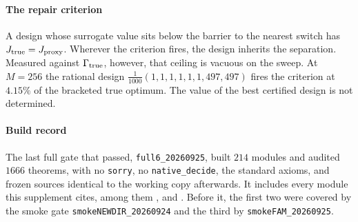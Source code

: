 \paragraph{The repair criterion} A design whose surrogate value sits below the barrier to the
nearest switch has $J_{\rm true}=J_{\rm proxy}$. Wherever the criterion fires, the design
inherits the separation. Measured against $\Gamma_{\rm true}$, however, that ceiling is vacuous on
the sweep. At $M=256$ the rational design $\frac{1}{1000}(1,1,1,1,1,1,497,497)$ fires the
criterion at $4.15\%$ of the bracketed true optimum. \CERT{} The value of the best certified
design is not determined.


\paragraph{Build record} The last full gate that passed, \texttt{full6\_20260925}, built $214$
modules and audited $1666$ theorems, with no \texttt{sorry}, no \texttt{native\_decide}, the
standard axioms, and frozen sources identical to the working copy afterwards. It includes every
module this supplement cites, among them ,
 and . Before it, the first
two were covered by the smoke gate \texttt{smokeNEWDIR\_20260924} and the third by
\texttt{smokeFAM\_20260925}.


